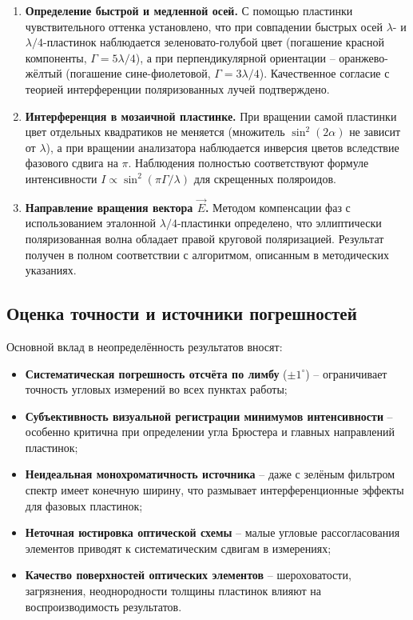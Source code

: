 \documentclass[a4paper]{article}
\begin{document}
\begin{enumerate}
    \item \textbf{Определение быстрой и медленной осей.} С помощью пластинки чувствительного оттенка установлено, что при совпадении быстрых осей $\lambda$- и $\lambda/4$-пластинок наблюдается зеленовато-голубой цвет (погашение красной компоненты, $\Gamma = 5\lambda/4$), а при перпендикулярной ориентации -- оранжево-жёлтый (погашение сине-фиолетовой, $\Gamma = 3\lambda/4$). Качественное согласие с теорией интерференции поляризованных лучей подтверждено.
    
    \item \textbf{Интерференция в мозаичной пластинке.} При вращении самой пластинки цвет отдельных квадратиков не меняется (множитель $\sin^2(2\alpha)$ не зависит от $\lambda$), а при вращении анализатора наблюдается инверсия цветов вследствие фазового сдвига на $\pi$. Наблюдения полностью соответствуют формуле интенсивности $I \propto \sin^2(\pi\Gamma/\lambda)$ для скрещенных поляроидов.
    
    \item \textbf{Направление вращения вектора $\vec{E}$.} Методом компенсации фаз с использованием эталонной $\lambda/4$-пластинки определено, что эллиптически поляризованная волна обладает правой круговой поляризацией. Результат получен в полном соответствии с алгоритмом, описанным в методических указаниях.
\end{enumerate}

\subsection*{Оценка точности и источники погрешностей}
Основной вклад в неопределённость результатов вносят:
\begin{itemize}
    \item \textbf{Систематическая погрешность отсчёта по лимбу} ($\pm 1^\circ$) -- ограничивает точность угловых измерений во всех пунктах работы;
    \item \textbf{Субъективность визуальной регистрации минимумов интенсивности} -- особенно критична при определении угла Брюстера и главных направлений пластинок;
    \item \textbf{Неидеальная монохроматичность источника} -- даже с зелёным фильтром спектр имеет конечную ширину, что размывает интерференционные эффекты для фазовых пластинок;
    \item \textbf{Неточная юстировка оптической схемы} -- малые угловые рассогласования элементов приводят к систематическим сдвигам в измерениях;
    \item \textbf{Качество поверхностей оптических элементов} -- шероховатости, загрязнения, неоднородности толщины пластинок влияют на воспроизводимость результатов.
\end{itemize}
\end{document}
